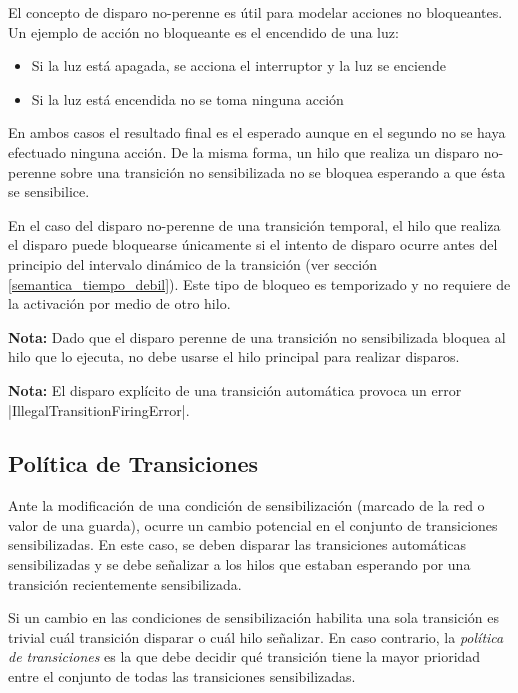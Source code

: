 El concepto de disparo no-perenne es útil para modelar acciones no bloqueantes.
Un ejemplo de acción no bloqueante es el encendido de una luz:
\begin{itemize}
    \item Si la luz está apagada, se acciona el interruptor y la luz se enciende
    \item Si la luz está encendida no se toma ninguna acción
\end{itemize}
En ambos casos el resultado final es el esperado aunque en el segundo no se haya
efectuado ninguna acción.
De la misma forma, un hilo que realiza un disparo no-perenne sobre una
transición no sensibilizada no se bloquea esperando a que ésta se sensibilice.

En el caso del disparo no-perenne de una transición temporal, el hilo
que realiza el disparo puede bloquearse únicamente si el intento de disparo
ocurre antes del principio del intervalo dinámico de la transición (ver sección
\ref{semantica_tiempo_debil}). Este tipo de bloqueo es temporizado y no requiere
de la activación por medio de otro hilo.

\begin{framed}
\textbf{Nota:} Dado que el disparo perenne de una transición no sensibilizada
bloquea al hilo que lo ejecuta, no debe usarse el hilo principal para realizar
disparos.
\end{framed}

\begin{framed}
\textbf{Nota:} El disparo explícito de una transición automática provoca un
error |IllegalTransitionFiringError|.
\end{framed}

\subsection{Política de Transiciones}
\label{sec:politica_transiciones}
Ante la modificación de una condición de sensibilización (marcado de la red o
valor de una guarda), ocurre un cambio potencial en el conjunto de transiciones
sensibilizadas.
En este caso, se deben disparar las transiciones automáticas sensibilizadas y
se debe señalizar a los hilos que estaban esperando por una transición
recientemente sensibilizada.

Si un cambio en las condiciones de sensibilización habilita una sola
transición es trivial cuál transición disparar o cuál hilo señalizar. En caso
contrario, la \textit{política de transiciones} es la que debe decidir qué
transición tiene la mayor prioridad entre el conjunto de todas las transiciones
sensibilizadas.

